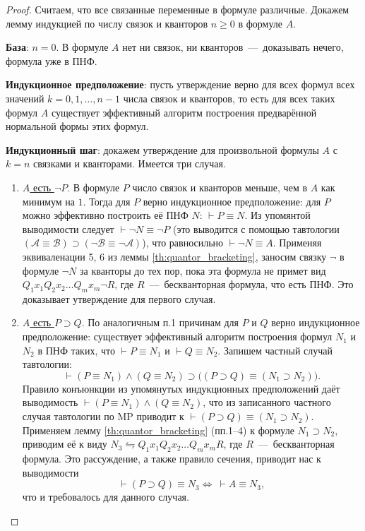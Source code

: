 \begin{proof}
    Считаем, что все связанные переменные в формуле различные. Докажем лемму индукцией по числу связок и кванторов $n \geqslant 0$ в формуле $A$.

    \textbf{База}: $n = 0$. В формуле $A$ нет ни связок, ни кванторов~---~доказывать нечего, формула уже в ПНФ.

    \textbf{Индукционное предположение}: пусть утверждение верно для всех формул всех значений $k = 0, 1, \dots, n - 1$ числа связок и кванторов, то есть для всех таких формул $A$ существует эффективный алгоритм построения предварённой нормальной формы этих формул.

    \textbf{Индукционный шаг}: докажем утверждение для произвольной формулы $A$ с $k = n$ связками и кванторами. Имеется три случая.
    \begin{enumerate}
        \item \underline{$A$ есть $\neg P$}. В формуле $P$ число связок и кванторов меньше, чем в $A$ как минимум на $1$. Тогда для $P$ верно индукционное предположение: для $P$ можно эффективно построить её ПНФ $N$: $\vdash P \equiv N$. Из упомянтой выводимости следует $\vdash \neg N \equiv \neg P$ (это выводится с помощью тавтологии $(\mathcal{A} \equiv \mathcal{B}) \supset (\neg\mathcal{B} \equiv \neg\mathcal{A})$), что равносильно $\vdash \neg N \equiv A$. Применяя эквиваленации 5, 6 из леммы \ref{th:quantor_bracketing}, заносим связку $\neg$ в формуле $\neg N$ за кванторы до тех пор, пока эта формула не примет вид $Q_1x_1Q_2x_2\dots Q_mx_m\neg R$, где $R$~---~бескванторная формула, что есть ПНФ. Это доказывает утверждение для первого случая.
        
        \item \underline{$A$ есть $P \supset Q$}. По аналогичным п.1 причинам для $P$ и $Q$ верно индукционное предположение: существует эффективный алгоритм построения формул $N_1$ и $N_2$ в ПНФ таких, что $\vdash P \equiv N_1$ и $\vdash Q \equiv N_2$. Запишем частный случай тавтологии:
        \[
            \vdash (P \equiv N_1) \land (Q \equiv N_2) \supset \big((P \supset Q) \equiv (N_1 \supset N_2)\big).
        \]
        Правило конъюнкции из упомянутых индукционных предположений даёт выводимость $\vdash (P \equiv N_1) \land (Q \equiv N_2)$, что из записанного частного случая тавтологии по MP приводит к $\vdash (P \supset Q) \equiv (N_1 \supset N_2)$. Применяем лемму \ref{th:quantor_bracketing} (пп.1--4) к формуле $N_1 \supset N_2$, приводим её к виду $N_3 \leftrightharpoons Q_1x_1Q_2x_2\dots Q_mx_mR$, где $R$~---~бескванторная формула. Это рассуждение, а также правило сечения, приводит нас к выводимости 
        \[
            \vdash (P \supset Q) \equiv N_3 \Longleftrightarrow\ \vdash A \equiv N_3,
        \]
        что и требовалось для данного случая.


\end{enumerate}
\end{proof}
